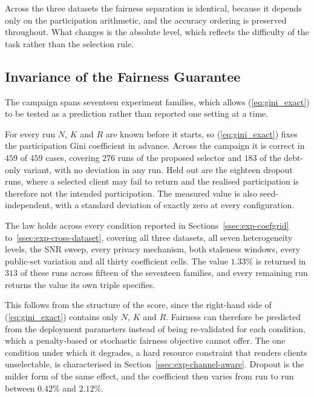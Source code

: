 \documentclass[journal]{IEEEtran}
\newcommand{\rev}[1]{{\color{blue}#1}}
\begin{document}
\rev{Across the three datasets the fairness separation is identical, because it depends only on the participation arithmetic, and the accuracy ordering is preserved throughout. What changes is the absolute level, which reflects the difficulty of the task rather than the selection rule.}

\subsection{Invariance of the Fairness Guarantee}
\label{ssec:exp-invariance}

\rev{The campaign spans seventeen experiment families, which allows (\ref{eq:gini_exact}) to be tested as a prediction rather than reported one setting at a time.}

\rev{For every run $N$, $K$ and $R$ are known before it starts, so (\ref{eq:gini_exact}) fixes the participation Gini coefficient in advance. Across the campaign it is correct in $459$ of $459$ cases, covering $276$ runs of the proposed selector and $183$ of the debt-only variant, with no deviation in any run. Held out are the eighteen dropout runs, where a selected client may fail to return and the realised participation is therefore not the intended participation. The measured value is also seed-independent, with a standard deviation of exactly zero at every configuration.}

\rev{The law holds across every condition reported in Sections~\ref{ssec:exp-coefgrid} to~\ref{ssec:exp-cross-dataset}, covering all three datasets, all seven heterogeneity levels, the SNR sweep, every privacy mechanism, both staleness windows, every public-set variation and all thirty coefficient cells. The value $1.33\%$ is returned in $313$ of these runs across fifteen of the seventeen families, and every remaining run returns the value its own triple specifies.}

\rev{This follows from the structure of the score, since the right-hand side of (\ref{eq:gini_exact}) contains only $N$, $K$ and $R$. Fairness can therefore be predicted from the deployment parameters instead of being re-validated for each condition, which a penalty-based or stochastic fairness objective cannot offer. The one condition under which it degrades, a hard resource constraint that renders clients unselectable, is characterised in Section~\ref{ssec:exp-channel-aware}. Dropout is the milder form of the same effect, and the coefficient then varies from run to run between $0.42\%$ and $2.12\%$.}
\end{document}
